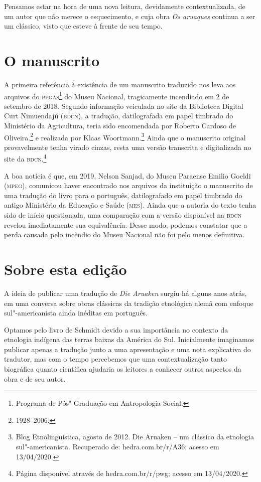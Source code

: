 Pensamos estar na hora de uma nova leitura, devidamente contextualizada, de um autor que não merece o esquecimento, e cuja obra \textit{Os aruaques} continua a ser um clássico, visto que esteve à frente de seu tempo.

\section{O manuscrito}

A primeira referência à existência de um manuscrito traduzido nos leva aos arquivos do \textsc{ppgas}\footnote{Programa de Pós"-Graduação em Antropologia Social.} do Museu Nacional, 
tragicamente incendiado em 2 de setembro de 2018. Segundo informação veiculada no site da Biblioteca Digital Curt Nimuendajú (\textsc{bdcn}), a tradução, datilografada em papel timbrado do Ministério da Agricultura, teria sido encomendada por Roberto Cardoso de Oliveira.\footnote{1928--2006.} e realizada por Klaas Woortmann.\footnote{Blog Etnolinguistica, agosto de 2012. Die Aruaken -- um clássico da etnologia sul"-americanista. Recuperado de: hedra.com.br/r/A36; acesso em 13/04/2020.} Ainda que o manuscrito original provavelmente tenha virado cinzas, resta uma versão transcrita e digitalizada no site da \textsc{bdcn}.\footnote{Página disponível através de hedra.com.br/r/pwg; acesso em 13/04/2020.} 

A boa notícia é que, em 2019, Nelson Sanjad, do Museu Paraense Emilio Goeldi (\textsc{mpeg}), comunicou haver encontrado nos arquivos da instituição o manuscrito de uma tradução do livro para o português, datilografado em papel timbrado do antigo Ministério da Educação e Saúde (\textsc{mes}). Ainda que a autoria do texto tenha sido de início questionada, uma comparação com a versão disponível na \textsc{bdcn} revelou imediatamente sua equivalência. Desse modo, podemos constatar que a perda causada pelo incêndio do Museu Nacional não foi pelo menos definitiva.

\section{Sobre esta edição}

A ideia de publicar uma tradução de \textit{Die Aruaken} surgiu há alguns anos atrás, em uma conversa sobre obras clássicas da tradição etnológica alemã com enfoque sul"-americanista ainda inéditas em português. 

Optamos pelo livro de Schmidt devido a sua importância no contexto da etnologia indígena das terras baixas da América do Sul. Inicialmente imaginamos publicar apenas a tradução junto a uma apresentação e uma nota explicativa do tradutor, mas com o tempo percebemos que uma contextualização tanto biográfica quanto científica ajudaria os leitores a conhecer outros aspectos da obra e de seu autor.

